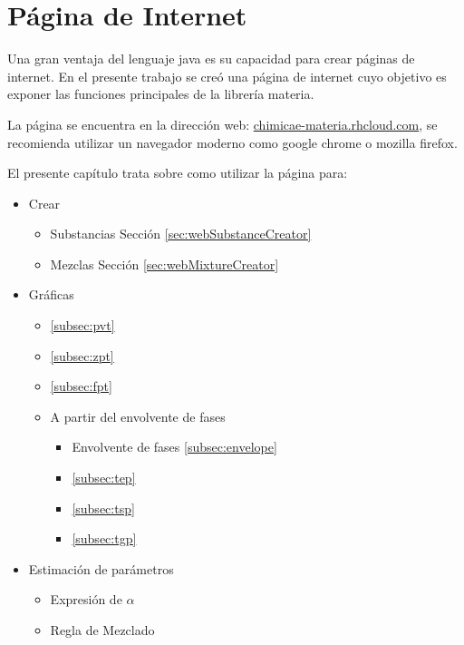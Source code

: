\chapter{Página de Internet}\label{chap:webPage}

	Una gran ventaja del lenguaje java es su capacidad para crear páginas de internet. En el presente trabajo se creó una página de internet cuyo objetivo es exponer las funciones principales de la librería materia.

	La página se encuentra en la dirección web: \url{chimicae-materia.rhcloud.com}, se recomienda utilizar un navegador moderno como google chrome o mozilla firefox.

	El presente capítulo trata sobre como utilizar la página para:

	\begin{itemize}
		\item{Crear}
			\begin{itemize}
				\item{Substancias} Sección \ref{sec:webSubstanceCreator}
				\item{Mezclas} Sección \ref{sec:webMixtureCreator}
			\end{itemize}
		\item{Gráficas}
			\begin{itemize}
				\item {} \ref{subsec:pvt}
				\item {} \ref{subsec:zpt}
				\item {} \ref{subsec:fpt}
				\item {A partir del envolvente de fases}
				\begin{itemize}
					\item {Envolvente de fases} \ref{subsec:envelope}
					\item {} \ref{subsec:tep}
					\item {} \ref{subsec:tsp}
					\item {} \ref{subsec:tgp}
				\end{itemize}
			\end{itemize}
		\item{Estimación de parámetros}
			\begin{itemize}
				\item Expresión de $\alpha$
				\item Regla de Mezclado
			\end{itemize}
	\end{itemize}

